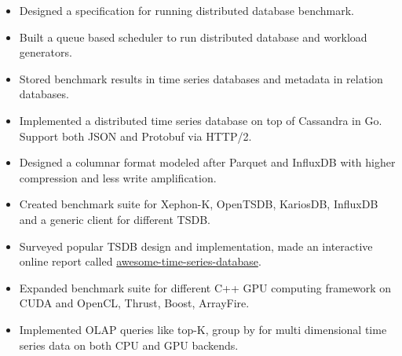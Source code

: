 \documentclass[11pt, letterpaper]{simple-cv}
\begin{document}


\begin{itemize}
	\item Designed a specification for running distributed database benchmark.
	\item Built a queue based scheduler to run distributed database and workload generators.
	\item Stored benchmark results in time series databases and metadata in relation databases.
\end{itemize}



\begin{itemize}
	\item Implemented a distributed time series database on top of Cassandra in Go. Support both JSON and Protobuf via HTTP/2.
	\item Designed a columnar format modeled after Parquet and InfluxDB with higher compression and less write amplification.
	\item Created benchmark suite for Xephon-K, OpenTSDB, KariosDB, InfluxDB and a generic client for different TSDB.
	\item Surveyed popular TSDB design and implementation, made an interactive online report called \href{https://xephonhq.github.io/awesome-time-series-database}{awesome-time-series-database}.
\end{itemize}


\begin{itemize}
	\item Expanded benchmark suite for different C++ GPU computing framework on CUDA and OpenCL, Thrust, Boost, ArrayFire.
	\item Implemented OLAP queries like top-K, group by for multi dimensional time series data on both CPU and GPU backends.
\end{itemize}
\end{document}
